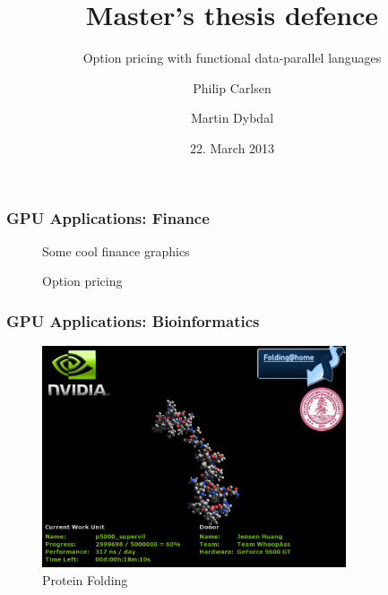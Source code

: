 \documentclass{beamer}
\title{Master's thesis defence}
\subtitle{Option pricing with functional data-parallel languages}
\author{Philip Carlsen \and Martin Dybdal}
\date{22. March 2013}
\institute{Computer Science\\
University of Copenhagen}
\begin{document}
\frame{\titlepage}


\begin{frame}
  \frametitle{GPU Applications: Finance}
  \begin{figure}
    \centering
    Some cool finance graphics
    \caption{Option pricing}
\label{fig:gpufinance}
\end{figure}
\end{frame}
\begin{frame}
  \frametitle{GPU Applications: Bioinformatics}
  \begin{figure}
    \centering
    \includegraphics[width=0.8\textwidth]{graphics/fah_clientGeForce9600GT.png}
    \caption{Protein Folding}
\label{fig:foldingathome}
\end{figure}


\end{frame} 
\end{document}
